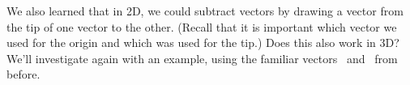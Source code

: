 {\begin{myfigure}
\begin{center}
\end{center}
\label{fig:add_3D}
\end{myfigure}
\baselineskip}

\medskip

We also learned that in 2D, we could subtract vectors by drawing a vector from the tip of one vector to the other. (Recall that it is important which vector we used for the origin and which was used for the tip.) Does this also work in 3D? We'll investigate again with an example, using the familiar vectors \vv\ and \vu\ from before.

\medskip

